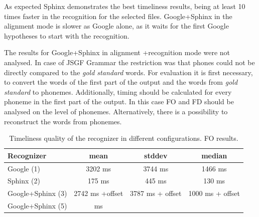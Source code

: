 As expected Sphinx demonstrates the best timeliness results, being at least 10
times faster in the recognition for the selected files. Google+Sphinx in the alignment
mode is slower as Google alone, as it waits for the first Google hypotheses to
start with the recognition. 

The results for Google+Sphinx in alignment +recognition mode were not
analysed. In case of JSGF Grammar the restriction was that phones could not be
directly compared to the \textit {gold standard} words.  For evaluation it is first
necessary, to convert the words of the first part of the
output and the words from \textit {gold standard} to phonemes.  Additionally,
timing should be calculated for every phoneme in the first part of the output. 
In this case FO and FD should be analysed on the level of phonemes.
Alternatively, there is a possibility to reconstruct the words from phonemes. 
 \begin {table}
\begin{center}
\caption {Timeliness quality of the recognizer in different configurations. FO
results.}
    \begin{tabular}{ l  c  c  c }
    \toprule
    Recognizer & mean & stddev & median \\ \toprule
    Google (1)  & 3202 ms & 3744 ms &  1466 ms\\
    Sphinx (2)  &175 ms & 445 ms & 130 ms \\
    Google+Sphinx (3)  & 2742 ms +offset  & 3787 ms + offset & 1000 ms + offset 
    \\
    Google+Sphinx (5)  & ms & &  \\ \bottomrule  
    \end{tabular}
    \label{tab:FO}
\end{center} 
\end {table}

